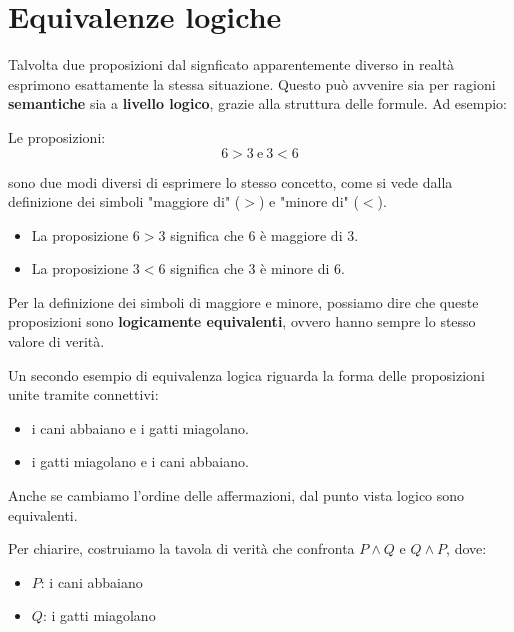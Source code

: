 \section{Equivalenze logiche}
Talvolta due proposizioni dal signficato apparentemente  diverso in realtà esprimono esattamente la stessa situazione. Questo può avvenire sia per ragioni \textbf{semantiche}  sia a \textbf{livello logico}, grazie alla struttura delle formule.
Ad esempio:

Le proposizioni: 
\[
6 > 3 \ \text{e} \ 3<6
\]

 sono due modi diversi di esprimere lo stesso concetto,  come si vede dalla definizione dei simboli "maggiore di" (\(>\)) e "minore di" (\(<\)).

\begin{itemize}
    \item La proposizione \(6 > 3\) significa che \(6\) è maggiore di \(3\).
    \item La proposizione \(3 < 6\) significa che \(3\) è minore di \(6\).
\end{itemize}


Per la definizione dei simboli di maggiore e minore, possiamo dire che queste proposizioni sono \textbf{logicamente equivalenti}, ovvero hanno sempre lo stesso valore di verità.



Un secondo esempio di equivalenza logica riguarda la forma delle proposizioni unite tramite connettivi: 
\begin{itemize}
    \item i cani abbaiano e i gatti miagolano.
    \item i gatti miagolano e i cani abbaiano.
\end{itemize}

Anche se cambiamo l'ordine delle affermazioni, dal punto vista logico sono equivalenti. 

Per chiarire, costruiamo la tavola  di verità che confronta  \(P \land Q\)  e 
\(Q \land P\), dove:
\begin{itemize}
    \item $P$: i cani abbaiano
    \item $Q$: i gatti miagolano 
\end{itemize}




